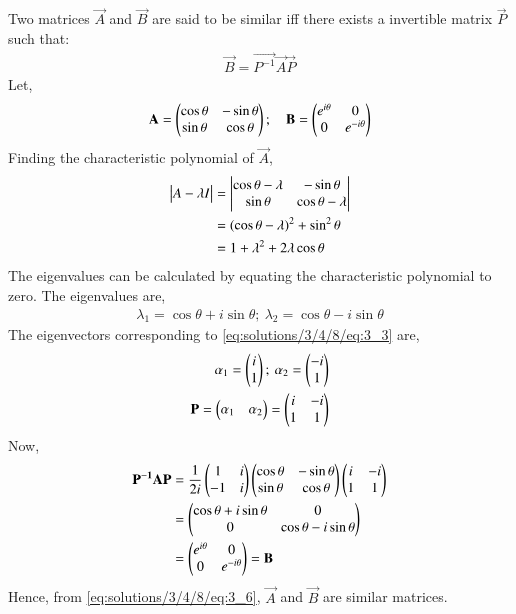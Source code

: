 Two matrices $\vec{A}$ and $\vec{B}$ are said to be similar iff there exists a invertible matrix $\vec{P}$ such that:
\begin{align} \label{eq:solutions/3/4/8/eq:2_1}
    \vec{B} = \vec{P^{-1}}\vec{A}\vec{P}
\end{align}
Let,
\begin{align}
    \mathbf{A} = \begin{pmatrix}\cos{\theta} & -\sin{\theta} \\ \sin{\theta} & \cos{\theta}\end{pmatrix}; \quad
    \mathbf{B} = \begin{pmatrix}e^{i\theta} & 0 \\ 0 & e^{-i\theta}\end{pmatrix} \label{eq:solutions/3/4/8/eq:3_1}
\end{align}
Finding the characteristic polynomial of $\vec{A}$,
\begin{align}
    \begin{vmatrix}A-\lambda I\end{vmatrix} &= 
    \begin{vmatrix}\cos{\theta}-\lambda & -\sin{\theta} \\ 
    \sin{\theta} & \cos{\theta}-\lambda\end{vmatrix} \nonumber \\
    &= (\cos{\theta-\lambda})^2 + \sin^2{\theta} \nonumber \\
    &= 1+\lambda^2+2\lambda\cos{\theta} \label{eq:solutions/3/4/8/eq:3_2}
\end{align}
The eigenvalues can be calculated by equating the characteristic polynomial to zero. The eigenvalues are,
\begin{align}
    \lambda_1 = \cos{\theta} + i \sin{\theta}; \:
    \lambda_2 = \cos{\theta} - i \sin{\theta} \label{eq:solutions/3/4/8/eq:3_3}
\end{align}
The eigenvectors corresponding to \eqref{eq:solutions/3/4/8/eq:3_3} are,
\begin{align}
    \alpha_1 = \begin{pmatrix}i \\ 1\end{pmatrix}; \: \alpha_2 = \begin{pmatrix}-i \\ 1\end{pmatrix} \label{eq:solutions/3/4/8/eq:3_4} \\
    \mathbf{P} = \begin{pmatrix}\alpha_1 & \alpha_2\end{pmatrix} = \begin{pmatrix}i & -i \\ 1 & 1\end{pmatrix} \label{eq:solutions/3/4/8/eq:3_5} 
\end{align}
Now,
\begin{align}
    \mathbf{P^{-1}}\mathbf{A}\mathbf{P} &= \frac{1}{2i} \begin{pmatrix}1 & i \\ -1 & i\end{pmatrix} \begin{pmatrix}\cos{\theta} & -\sin{\theta} \\ \sin{\theta} & \cos{\theta}\end{pmatrix} \begin{pmatrix}i & -i \\ 1 & 1\end{pmatrix} \nonumber \\
    &= \begin{pmatrix}\cos{\theta} + i \sin{\theta} & 0 \\ 0 & \cos{\theta} - i \sin{\theta}\end{pmatrix} \nonumber \\
    &= \begin{pmatrix}e^{i\theta} & 0 \\ 0 & e^{-i\theta}\end{pmatrix} = \mathbf{B} \label{eq:solutions/3/4/8/eq:3_6}
\end{align}
Hence, from \eqref{eq:solutions/3/4/8/eq:3_6}, $\vec{A}$ and $\vec{B}$ are similar matrices. 
